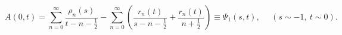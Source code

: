 \begin{equation}
A(0,t) =
\sum_{n=0}^\infty
 \frac{\rho_n(s)}{t-n-\frac{1}{2}}-\sum_{n=0}^\infty
\left(
\frac{r_n(t)}{s-n-\frac{1}{2}}+\frac{r_n(t)}{n+\frac{1}{2}}
\right)
\equiv \Psi_1(s,t),\ \ \ \ \ \ (s \sim -1,\  t \sim 0).
\label{14}
\end{equation}

